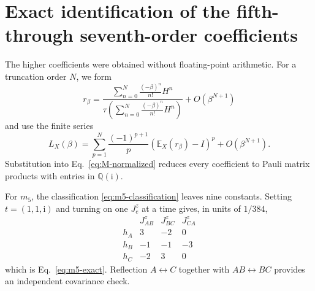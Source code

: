 \documentclass[aps,prb,preprint,nofootinbib,longbibliography]{revtex4-2}
\newcommand{\ii}{\mathrm{i}}
\newcommand{\E}{\mathbb{E}}
\begin{document}
\section{Exact identification of the fifth- through seventh-order coefficients}
\label{app:higher-orders}

The higher coefficients were obtained without floating-point arithmetic.  For
a truncation order $N$, we form
\begin{equation}
 r_\beta=
 \frac{\displaystyle\sum_{n=0}^N\frac{(-\beta)^n}{n!}H^n}
 {\displaystyle\tau\left(\sum_{n=0}^N\frac{(-\beta)^n}{n!}H^n\right)}
 +O(\beta^{N+1})
 \label{eq:exact-r-series}
\end{equation}
and use the finite series
\begin{equation}
 L_X(\beta)=
 \sum_{p=1}^N\frac{(-1)^{p+1}}{p}
 \left(\E_X(r_\beta)-I\right)^p+O(\beta^{N+1}).
 \label{eq:exact-log-series}
\end{equation}
Substitution into Eq.~\eqref{eq:M-normalized} reduces every coefficient to
Pauli matrix products with entries in $\mathbb Q(\ii)$.

For $m_5$, the classification \eqref{eq:m5-classification} leaves nine
constants.  Setting $t=(1,1,\ii)$ and turning on one $J_e^z$ at a time gives,
in units of $1/384$,
\begin{equation}
\begin{array}{c|rrr}
 &J_{AB}^z&J_{BC}^z&J_{CA}^z\\
\hline
h_A&3&-2&0\\
h_B&-1&-1&-3\\
h_C&-2&3&0
\end{array}
\label{eq:m5-coefficient-table}
\end{equation}
which is Eq.~\eqref{eq:m5-exact}.  Reflection
$A\leftrightarrow C$ together with $AB\leftrightarrow BC$ provides an
independent covariance check.
\end{document}
